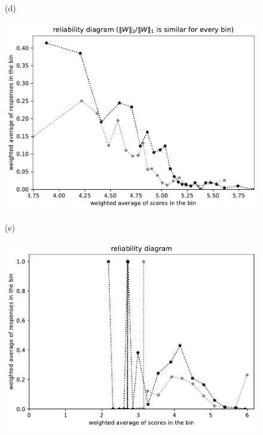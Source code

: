 \documentclass{article}
\newlength{\vertsep}
\newlength{\imsize}
\begin{document}
\begin{figure}
\begin{centering}
(d)
\parbox{\imsize}{\includegraphics[width=\imsize]
{../codes/weighted/County_of_San_Francisco_vs_San_Joaquin-LNGI/equierrs20.pdf}}
\quad\quad
(e)
\parbox{\imsize}{\includegraphics[width=\imsize]
{../codes/weighted/County_of_San_Francisco_vs_San_Joaquin-LNGI/equiscores20.pdf}}

\vspace{\vertsep}


\end{centering}
\end{figure}
\end{document}

